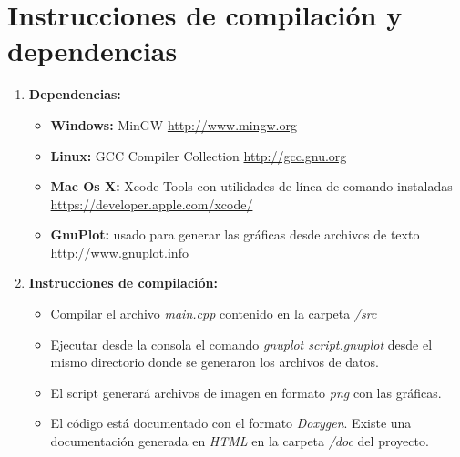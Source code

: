 \section{Instrucciones de compilación y dependencias}
\begin{enumerate}
	\item \textbf{Dependencias:}
		\begin{itemize}
			\item \textbf{Windows:}  MinGW  \url{http://www.mingw.org}
			\item \textbf{Linux:} GCC Compiler Collection  \url{http://gcc.gnu.org}
			\item \textbf{Mac Os X:} Xcode Tools con utilidades de línea de comando instaladas  							\url{https://developer.apple.com/xcode/}
			\item \textbf{GnuPlot:}  usado para generar las gráficas desde archivos de texto 								\url{http://www.gnuplot.info}
		\end{itemize}
	\item \textbf{Instrucciones de compilación:}
			\begin{itemize}
			\item Compilar el archivo \textit{main.cpp} contenido en la carpeta \textit{/src}
			\item Ejecutar desde la consola el comando \textit{gnuplot script.gnuplot} desde el 					mismo directorio donde se generaron los archivos de datos.
			\item El script generará archivos de imagen en formato \textit{png} con las gráficas.
			\item El código está documentado con el formato \textit{Doxygen}. Existe una documentación generada en \textit{HTML} en la carpeta \textit{/doc} del proyecto.
			\end{itemize}
\end{enumerate}

